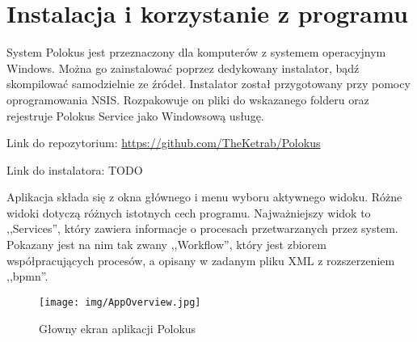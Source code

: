 \documentclass[declaration,shortabstract,mgr]{iithesis}
\begin{document}
\section{Instalacja i korzystanie z programu}

System Polokus jest przeznaczony dla komputerów z systemem operacyjnym Windows. Można go zainstalować poprzez dedykowany instalator, bądź skompilować samodzielnie ze źródeł. Instalator został przygotowany przy pomocy oprogramowania NSIS. Rozpakowuje on pliki do wskazanego folderu oraz rejestruje Polokus Service jako Windowsową usługę.

\noindent Link do repozytorium: \href{https://github.com/TheKetrab/Polokus}{https://github.com/TheKetrab/Polokus}

\noindent Link do instalatora: TODO



Aplikacja składa się z okna głównego i menu wyboru aktywnego widoku. Różne widoki dotyczą różnych istotnych cech programu. Najważniejszy widok to ,,Services'', który zawiera informacje o procesach przetwarzanych przez system. Pokazany jest na nim tak zwany ,,Workflow'', który jest zbiorem współpracujących procesów, a opisany w zadanym pliku XML z rozszerzeniem ,,bpmn''.

\begin{figure}[H]
    \texttt{[image: img/AppOverview.jpg]}
    \caption{Głowny ekran aplikacji Polokus}
    \label{fig:polokus-app}
\end{figure}
\end{document}
